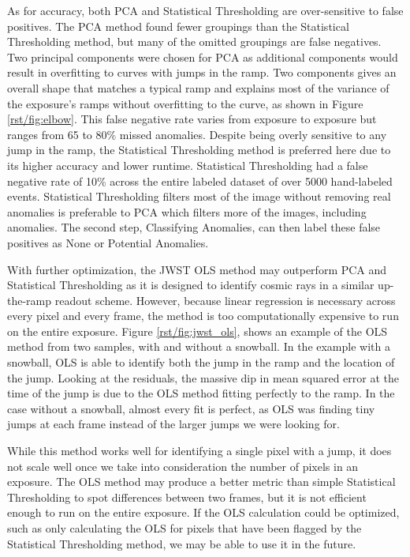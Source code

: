 As for accuracy, both PCA and Statistical Thresholding are over-sensitive to false positives.
The PCA method found fewer groupings than the Statistical Thresholding method, but many of the omitted groupings are false negatives.
Two principal components were chosen for PCA as additional components would result in overfitting to curves with jumps in the ramp.
Two components gives an overall shape that matches a typical ramp and explains most of the variance of the exposure's ramps without overfitting to the curve, as shown in Figure \ref{rst/fig:elbow}.
This false negative rate varies from exposure to exposure but ranges from 65 to 80\% missed anomalies. 
Despite being overly sensitive to any jump in the ramp, the Statistical Thresholding method is preferred here due to its higher accuracy and lower runtime.
Statistical Thresholding had a false negative rate of 10\% across the entire labeled dataset of over 5000 hand-labeled events. 
Statistical Thresholding filters most of the image without removing real anomalies is preferable to PCA which filters more of the images, including anomalies. 
The second step, Classifying Anomalies, can then label these false positives as None or Potential Anomalies. 

With further optimization, the JWST OLS method may outperform PCA and Statistical Thresholding as it is designed to identify cosmic rays in a similar up-the-ramp readout scheme.
However, because linear regression is necessary across every pixel and every frame, the method is too computationally expensive to run on the entire exposure.
Figure \ref{rst/fig:jwst_ols}, shows an example of the OLS method from two samples, with and without a snowball.
In the example with a snowball, OLS is able to identify both the jump in the ramp and the location of the jump.
Looking at the residuals, the massive dip in mean squared error at the time of the jump is due to the OLS method fitting perfectly to the ramp.
In the case without a snowball, almost every fit is perfect, as OLS was finding tiny jumps at each frame instead of the larger jumps we were looking for.

While this method works well for identifying a single pixel with a jump, it does not scale well once we take into consideration the number of pixels in an exposure.
The OLS method may produce a better metric than simple Statistical Thresholding to spot differences between two frames, but it is not efficient enough to run on the entire exposure.
If the OLS calculation could be optimized, such as only calculating the OLS for pixels that have been flagged by the Statistical Thresholding method, we may be able to use it in the future.

